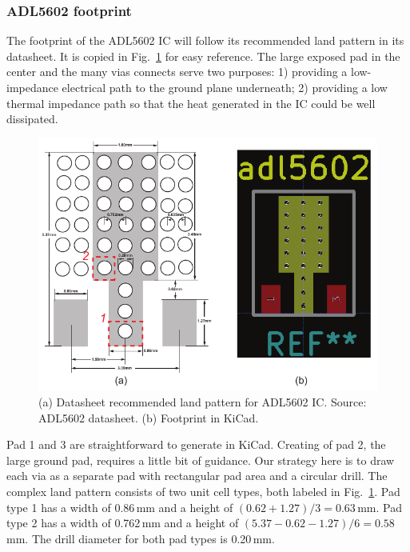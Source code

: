 \documentclass[12pt,letterpaper]{scrartcl}
\begin{document}
\subsubsection{ADL5602 footprint}

The footprint of the ADL5602 IC will follow its recommended land pattern in its datasheet. It is copied in Fig.~\ref{fig:adl5602-landpattern} for easy reference. The large exposed pad in the center and the many vias connects serve two purposes: 1) providing a low-impedance electrical path to the ground plane underneath; 2) providing a low thermal impedance path so that the heat generated in the IC could be well dissipated. 

\begin{figure}[ph]
	\centering
	\includegraphics[width=4.5in]{adl5602-landpattern}
	\caption{(a) Datasheet recommended land pattern for ADL5602 IC. Source: ADL5602 datasheet. (b) Footprint in KiCad.}
	\label{fig:adl5602-landpattern}
\end{figure}

Pad 1 and 3 are straightforward to generate in KiCad. Creating of pad 2, the large ground pad, requires a little bit of guidance. Our strategy here is to draw each via as a separate pad with rectangular pad area and a circular drill. The complex land pattern consists of two unit cell types, both labeled  in Fig.~\ref{fig:adl5602-landpattern}. Pad type 1 has a width of 0.86\,mm and a height of $(0.62+1.27)/3=0.63$\,mm. Pad type 2 has a width of 0.762\,mm and a height of $(5.37-0.62-1.27)/6=0.58$\,mm. The drill diameter for both pad types is 0.20\,mm. 
\end{document}
